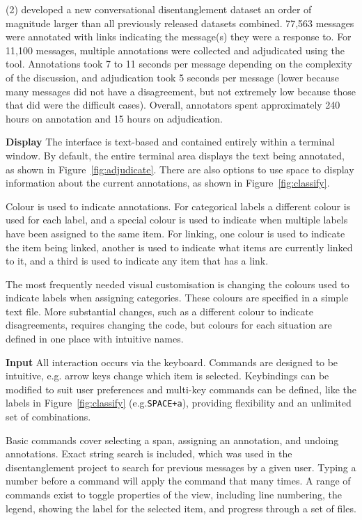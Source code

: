 \documentclass[11pt,a4paper]{article}
\makeatletter
\newcommand{\myeg}{e.g.\@\xspace}
\newcommand{\tightparagraph}[1]{\noindent\textbf{#1}}
\makeatother
\begin{document}
(2) \citet{acl19disentangle} developed a new conversational disentanglement dataset an order of magnitude larger than all previously released datasets combined.
77,563 messages were annotated with links indicating the message(s) they were a response to.
For 11,100 messages, multiple annotations were collected and adjudicated using the tool.
Annotations took 7 to 11 seconds per message depending on the complexity of the discussion, and adjudication took 5 seconds per message (lower because many messages did not have a disagreement, but not extremely low because those that did were the difficult cases).
Overall, annotators spent approximately 240 hours on annotation and 15 hours on adjudication.



\tightparagraph{Display}
The interface is text-based and contained entirely within a terminal window.
By default, the entire terminal area displays the text being annotated, as shown in Figure~\ref{fig:adjudicate}.
There are also options to use space to display information about the current annotations, as shown in Figure~\ref{fig:classify}.

Colour is used to indicate annotations.
For categorical labels a different colour is used for each label, and a special colour is used to indicate when multiple labels have been assigned to the same item.
For linking, one colour is used to indicate the item being linked, another is used to indicate what items are currently linked to it, and a third is used to indicate any item that has a link.

The most frequently needed visual customisation is changing the colours used to indicate labels when assigning categories.
These colours are specified in a simple text file.
More substantial changes, such as a different colour to indicate disagreements, requires changing the code, but colours for each situation are defined in one place with intuitive names.

\tightparagraph{Input}
All interaction occurs via the keyboard.
Commands are designed to be intuitive, \myeg arrow keys change which item is selected.
Keybindings can be modified to suit user preferences and multi-key commands can be defined, like the labels in Figure~\ref{fig:classify} (\myeg \texttt{SPACE+a}), providing flexibility and an unlimited set of combinations.

Basic commands cover selecting a span, assigning an annotation, and undoing annotations.
Exact string search is included, which was used in the disentanglement project to search for previous messages by a given user.
Typing a number before a command will apply the command that many times.
A range of commands exist to toggle properties of the view, including line numbering, the legend, showing the label for the selected item, and progress through a set of files.
\end{document}
